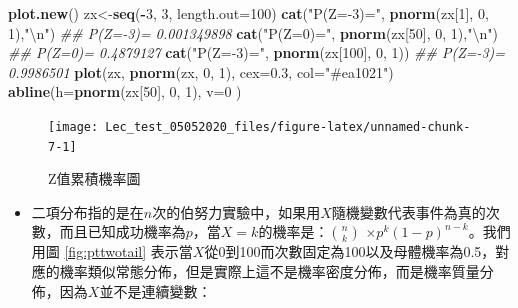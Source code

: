 \documentclass[hyperref,]{ctexart}
\newenvironment{Shaded}{\begin{snugshade}}{\end{snugshade}}
\newcommand{\CharTok}[1]{\textcolor[rgb]{0.31,0.60,0.02}{#1}}
\newcommand{\CommentTok}[1]{\textcolor[rgb]{0.56,0.35,0.01}{\textit{#1}}}
\newcommand{\DataTypeTok}[1]{\textcolor[rgb]{0.13,0.29,0.53}{#1}}
\newcommand{\DecValTok}[1]{\textcolor[rgb]{0.00,0.00,0.81}{#1}}
\newcommand{\FloatTok}[1]{\textcolor[rgb]{0.00,0.00,0.81}{#1}}
\newcommand{\KeywordTok}[1]{\textcolor[rgb]{0.13,0.29,0.53}{\textbf{#1}}}
\newcommand{\NormalTok}[1]{#1}
\newcommand{\OperatorTok}[1]{\textcolor[rgb]{0.81,0.36,0.00}{\textbf{#1}}}
\newcommand{\StringTok}[1]{\textcolor[rgb]{0.31,0.60,0.02}{#1}}
\providecommand{\tightlist}{%
  \setlength{\itemsep}{0pt}\setlength{\parskip}{0pt}}
\begin{document}
\begin{Shaded}
\begin{Highlighting}[]
\KeywordTok{plot.new}\NormalTok{()}
\NormalTok{zx<-}\KeywordTok{seq}\NormalTok{(}\OperatorTok{-}\DecValTok{3}\NormalTok{, }\DecValTok{3}\NormalTok{, }\DataTypeTok{length.out=}\DecValTok{100}\NormalTok{)}
\KeywordTok{cat}\NormalTok{(}\StringTok{"P(Z=-3)="}\NormalTok{, }\KeywordTok{pnorm}\NormalTok{(zx[}\DecValTok{1}\NormalTok{], }\DecValTok{0}\NormalTok{, }\DecValTok{1}\NormalTok{),}\StringTok{"}\CharTok{\textbackslash{}n}\StringTok{"}\NormalTok{)}
\CommentTok{## P(Z=-3)= 0.001349898}
\KeywordTok{cat}\NormalTok{(}\StringTok{"P(Z=0)="}\NormalTok{, }\KeywordTok{pnorm}\NormalTok{(zx[}\DecValTok{50}\NormalTok{], }\DecValTok{0}\NormalTok{, }\DecValTok{1}\NormalTok{),}\StringTok{"}\CharTok{\textbackslash{}n}\StringTok{"}\NormalTok{)}
\CommentTok{## P(Z=0)= 0.4879127}
\KeywordTok{cat}\NormalTok{(}\StringTok{"P(Z=-3)="}\NormalTok{, }\KeywordTok{pnorm}\NormalTok{(zx[}\DecValTok{100}\NormalTok{], }\DecValTok{0}\NormalTok{, }\DecValTok{1}\NormalTok{))}
\CommentTok{## P(Z=-3)= 0.9986501}
\KeywordTok{plot}\NormalTok{(zx, }\KeywordTok{pnorm}\NormalTok{(zx, }\DecValTok{0}\NormalTok{, }\DecValTok{1}\NormalTok{), }\DataTypeTok{cex=}\FloatTok{0.3}\NormalTok{, }\DataTypeTok{col=}\StringTok{"#ea1021"}\NormalTok{)}
\KeywordTok{abline}\NormalTok{(}\DataTypeTok{h=}\KeywordTok{pnorm}\NormalTok{(zx[}\DecValTok{50}\NormalTok{], }\DecValTok{0}\NormalTok{, }\DecValTok{1}\NormalTok{), }\DataTypeTok{v=}\DecValTok{0}\NormalTok{ )}
\end{Highlighting}
\end{Shaded}

\begin{figure}

\texttt{[image: Lec\_test\_05052020\_files/figure-latex/unnamed-chunk-7-1]} \hfill{}

\caption{\label{fig:zcum}Z值累積機率圖}\label{fig:unnamed-chunk-7}
\end{figure}

\begin{itemize}
\tightlist
\item
  二項分布指的是在\(n\)次的伯努力實驗中，如果用\(X\)隨機變數代表事件為真的次數，而且已知成功機率為\(p\)，當\(X=k\)的機率是：\({n}\choose{k}\)
  \(\times p^{k}(1-p)^{n-k}\)。我們用圖 \ref{fig:pttwotail}
  表示當\(X\)從0到100而次數固定為100以及母體機率為0.5，對應的機率類似常態分佈，但是實際上這不是機率密度分佈，而是機率質量分佈，因為\(X\)並不是連續變數：
\end{itemize}
\end{document}
